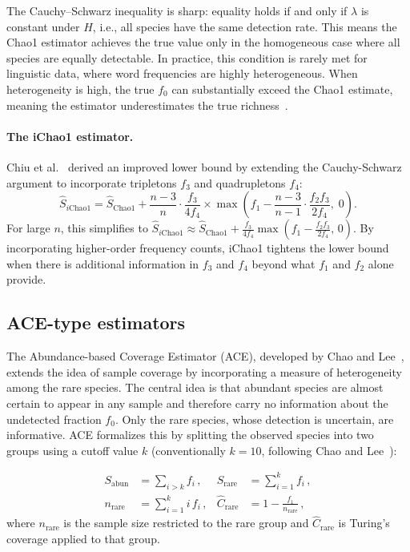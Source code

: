 \documentclass{article}
\begin{document}
{The Cauchy--Schwarz inequality is sharp: equality holds if and only if
$\lambda$ is constant under $H$, i.e., all species have the same
detection rate. This means the Chao1 estimator achieves the true
value only in the homogeneous case where all species are equally
detectable. In practice, this condition is rarely met for linguistic
data, where word frequencies are highly heterogeneous. When
heterogeneity is high, the true $f_0$ can substantially exceed the
Chao1 estimate, meaning the estimator underestimates the true
richness~\cite{chao2016species,schmitz2025}.


\paragraph{The iChao1 estimator.}
Chiu et al.~\cite{chiu2014} derived an improved lower bound by extending the Cauchy-Schwarz argument to incorporate tripletons $f_3$ and quadrupletons $f_4$:
\begin{equation}\label{eq:ichao1}
    \hat{S}_{i\mathrm{Chao1}} =
    \hat{S}_{\mathrm{Chao1}} +
    \frac{n-3}{n} \cdot \frac{f_3}{4 f_4}
    \times
    \max\!\left(
        f_1 - \frac{n-3}{n-1} \cdot \frac{f_2 f_3}{2 f_4},\; 0
    \right).
\end{equation}
For large $n$, this simplifies to
$\hat{S}_{i\mathrm{Chao1}} \approx \hat{S}_{\mathrm{Chao1}} 
+ \frac{f_3}{4 f_4} \max\!\left(f_1 - \frac{f_2 f_3}{2 f_4},\, 0\right)$.
By incorporating higher-order frequency counts, iChao1 tightens the lower bound when there is additional information in $f_3$ and $f_4$ beyond what $f_1$ and $f_2$ alone provide.


\subsection{ACE-type estimators}

The Abundance-based Coverage Estimator (ACE), developed by Chao and Lee~\cite{chaolee1992}, extends the idea of sample coverage by incorporating a measure of heterogeneity among the rare species. The central idea is that abundant species are almost certain to appear in any sample and therefore carry no information about the undetected fraction $f_0$. Only the rare species, whose detection is uncertain, are informative. ACE formalizes this by splitting the observed species into two groups using a cutoff value $k$ (conventionally $k = 10$, following Chao and Lee~\cite{chaolee1992}):

\begin{align*}
    S_{\mathrm{abun}} &= \sum_{i > k} f_i\,,  &
    S_{\mathrm{rare}} &= \sum_{i=1}^{k} f_i\,, \\[4pt]
    n_{\mathrm{rare}} &= \sum_{i=1}^{k} i\, f_i\,,  &
    \hat{C}_{\mathrm{rare}} &= 1 - \frac{f_1}{n_{\mathrm{rare}}}\,,
\end{align*}
where $n_{\mathrm{rare}}$ is the sample size restricted to the rare 
group and $\hat{C}_{\mathrm{rare}}$ is Turing's coverage applied to that group.

}
\end{document}
